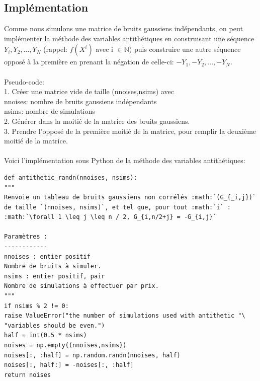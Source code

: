 \documentclass[12pt]{report}
\begin{document}
\subsection{Implémentation}
Comme nous simulons une matrice de bruits gaussiens indépendants, on peut implémenter la méthode des variables antithétiques en construisant une séquence $Y_i,Y_2,...,Y_N$ (rappel: $f(X^i)$ avec i $\in \mathbb{N})$ puis construire une autre séquence opposé à la première en prenant la négation de celle-ci: $-Y_1,-Y_2,...,-Y_N.$\\\\
Pseudo-code:\\
1. Créer une matrice vide de taille (nnoises,nsims) avec \\nnoises: nombre de bruits gaussiens indépendants \\ nsims: nombre de simulations\\
2. Générer dans la moitié de la matrice des bruits gaussiens.\\
3. Prendre l'opposé de la première moitié de la matrice, pour remplir la deuxième moitié de la matrice.\\\\
Voici l'implémentation sous Python de la méthode des variables antithétiques:
\begin{lstlisting}
def antithetic_randn(nnoises, nsims):
"""
Renvoie un tableau de bruits gaussiens non corrélés :math:`(G_{_i,j})`
de taille `(nnoises, nsims)`, et tel que, pour tout :math:`i` :
:math:`\forall 1 \leq j \leq n / 2, G_{i,n/2+j} = -G_{i,j}`

Paramètres :
------------
nnoises : entier positif
Nombre de bruits à simuler.
nsims : entier positif, pair
Nombre de simulations à effectuer par prix.
"""
if nsims % 2 != 0:
raise ValueError("the number of simulations used with antithetic "\
"variables should be even.")
half = int(0.5 * nsims)
noises = np.empty((nnoises,nsims))
noises[:, :half] = np.random.randn(nnoises, half)
noises[:, half:] = -noises[:, :half]
return noises

\end{lstlisting}
\newpage
\end{document}
